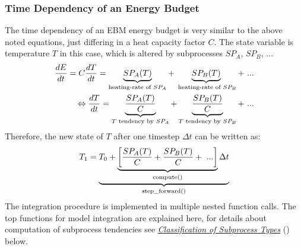 \documentclass[a4paper,10pt,english]{sphinxmanual}
\begin{document}
\subsubsection{Time Dependency of an Energy Budget}
\label{architecture:time-dependency-of-an-energy-budget}
The time dependency of an EBM energy budget is very similar to the above noted equations, just differing in a heat capacity factor \(C\). The state variable is temperature \(T\) in this case, which is altered by subprocesses \(SP_A\), \(SP_B\), ...
\begin{gather}
\begin{split}\frac{dE}{dt} = C \frac{dT}{dt} = \underbrace{SP_A(T)}_{\textrm{heating-rate of }SP_A} + \underbrace{SP_B(T)}_{\textrm{ heating-rate of }SP_B} + \ ...                          \\
\Leftrightarrow   \frac{dT}{dt} = \underbrace{\frac{SP_A(T)}{C}}_{T \textrm{ tendency by }SP_A} + \underbrace{\frac{SP_B(T)}{C}}_{T \textrm{ tendency by }SP_B} + \ ...\end{split}\notag
\end{gather}
Therefore, the new state of \(T\) after one timestep \(\Delta t\) can be written as:
\begin{gather}
\begin{split}T_1 = \underbrace{T_0 + \underbrace{ \left[ \frac{SP_A(T)}{C} + \frac{SP_B(T)}{C} + \ ... \right]}_{\textrm{compute()}}  \Delta t }_{\textrm{step\_forward()}}\end{split}\notag
\end{gather}
The integration procedure is implemented in multiple nested function calls. The top functions for model integration are explained here, for details about computation of subprocess tendencies see {\hyperref[architecture:classification\string-of\string-subprocess\string-types]{\emph{Classification of Subprocess Types}}} () below.
\end{document}
